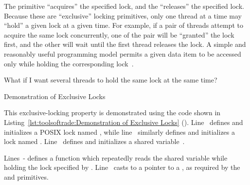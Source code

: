 The  primitive ``acquires'' the specified lock,
and the  ``releases'' the specified lock.
Because these are ``exclusive'' locking primitives,
only one thread at a time may ``hold'' a given lock at a given time.
For example, if a pair of threads attempt to acquire the same lock
concurrently, one of the pair will be ``granted'' the lock first, and
the other will wait until the first thread releases the lock.
A simple and reasonably useful programming model permits a given data item
to be accessed only while holding the corresponding
lock~\cite{Hoare74}.

\QuickQuiz{}
	What if I want several threads to hold the same lock at the
	same time?
 \QuickQuizEnd

\begin{listing}[tbp]

\caption{Demonstration of Exclusive Locks}
\label{lst:toolsoftrade:Demonstration of Exclusive Locks}
\end{listing}

\begin{lineref}
This exclusive-locking property is demonstrated using the code shown in
Listing~\ref{lst:toolsoftrade:Demonstration of Exclusive Locks}
().
Line~ defines and initializes a POSIX lock named , while
line~ similarly defines and initializes a lock named .
Line~ defines and initializes a shared variable~.
\end{lineref}

\begin{lineref}
Lines~- defines a function  which repeatedly
reads the shared variable  while holding
the lock specified by .
Line~ casts  to a pointer to a , as
required by the  and 
primitives.
\end{lineref}

